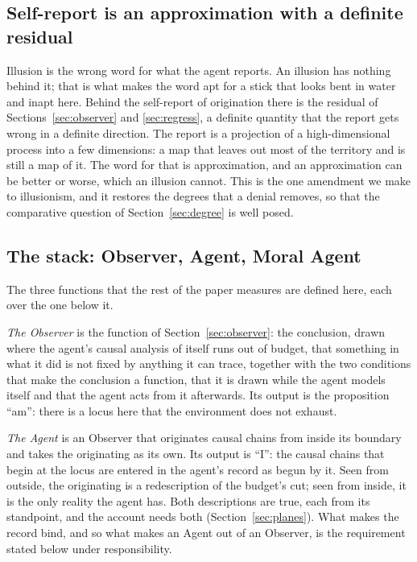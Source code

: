 \subsection{Self-report is an approximation with a definite residual}
\label{sec:approximation}

Illusion is the wrong word for what the agent reports. An illusion has nothing behind it; that is what
makes the word apt for a stick that looks bent in water and inapt here. Behind the self-report of
origination there is the residual of Sections~\ref{sec:observer} and \ref{sec:regress}, a definite
quantity that the report gets
wrong in a definite direction. The report is a projection of a high-dimensional process into a few
dimensions: a map that leaves out most of the territory and is still a map of it. The word for that is
approximation, and an approximation can be better or worse, which an illusion cannot. This is the one
amendment we make to illusionism, and it restores the degrees that a denial removes, so that the
comparative question of Section~\ref{sec:degree} is well posed.

\subsection{The stack: Observer, Agent, Moral Agent}
\label{sec:stack}

The three functions that the rest of the paper measures are defined here, each over the one below it.

\emph{The Observer} is the function of Section~\ref{sec:observer}: the conclusion, drawn where the
agent's causal analysis of itself runs out of budget, that something in what it did is not fixed by
anything it can trace, together with the two conditions that make the conclusion a function, that it
is drawn while the agent models itself and that the agent acts from it afterwards. Its output is the
proposition ``am'': there is a locus here that the environment does not exhaust.

\emph{The Agent} is an Observer that originates causal chains from inside its boundary and takes the
originating as its own. Its output is ``I'': the causal chains that begin at the locus are entered in
the agent's record as begun by it. Seen from outside, the originating is a redescription of the
budget's cut; seen from inside, it is the only reality the agent has. Both descriptions are true, each
from its standpoint, and the account needs both (Section~\ref{sec:planes}). What makes the record
bind, and so what makes an Agent out of an Observer, is the requirement stated below under
responsibility.

